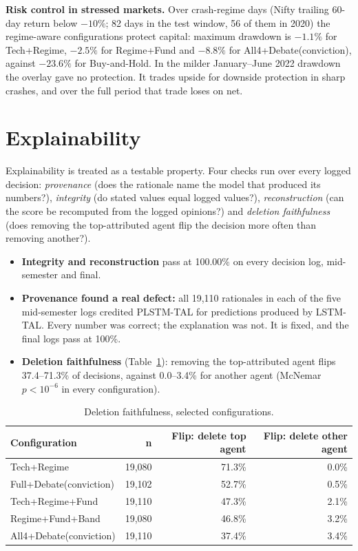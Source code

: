 \documentclass[10pt,a4paper]{article}
\begin{document}
\textbf{Risk control in stressed markets.} Over crash-regime days (Nifty trailing 60-day return below $-10\%$; 82 days in the test window, 56 of them in 2020) the regime-aware configurations protect capital: maximum drawdown is $-1.1\%$ for Tech+Regime, $-2.5\%$ for Regime+Fund and $-8.8\%$ for All4+Debate(conviction), against $-23.6\%$ for Buy-and-Hold. In the milder January--June 2022 drawdown the overlay gave no protection. It trades upside for downside protection in sharp crashes, and over the full period that trade loses on net.

\section{Explainability}
Explainability is treated as a testable property. Four checks run over every logged decision: \emph{provenance} (does the rationale name the model that produced its numbers?), \emph{integrity} (do stated values equal logged values?), \emph{reconstruction} (can the score be recomputed from the logged opinions?) and \emph{deletion faithfulness} (does removing the top-attributed agent flip the decision more often than removing another?).
\begin{itemize}
\item \textbf{Integrity and reconstruction} pass at 100.00\% on every decision log, mid-semester and final.
\item \textbf{Provenance found a real defect:} all 19,110 rationales in each of the five mid-semester logs credited PLSTM-TAL for predictions produced by LSTM-TAL. Every number was correct; the explanation was not. It is fixed, and the final logs pass at 100\%.
\item \textbf{Deletion faithfulness} (Table~\ref{tab:del}): removing the top-attributed agent flips 37.4--71.3\% of decisions, against 0.0--3.4\% for another agent (McNemar $p<10^{-6}$ in every configuration).
\end{itemize}

\begin{table}[H]
\centering\small
\caption{Deletion faithfulness, selected configurations.}\label{tab:del}
\begin{tabular}{lrrr}
\toprule
\textbf{Configuration} & \textbf{n} & \textbf{Flip: delete top agent} & \textbf{Flip: delete other agent} \\
\midrule
Tech+Regime & 19,080 & 71.3\% & 0.0\% \\
Full+Debate(conviction) & 19,102 & 52.7\% & 0.5\% \\
Tech+Regime+Fund & 19,110 & 47.3\% & 2.1\% \\
Regime+Fund+Band & 19,080 & 46.8\% & 3.2\% \\
All4+Debate(conviction) & 19,110 & 37.4\% & 3.4\% \\
\bottomrule
\end{tabular}
\end{table}
\end{document}
